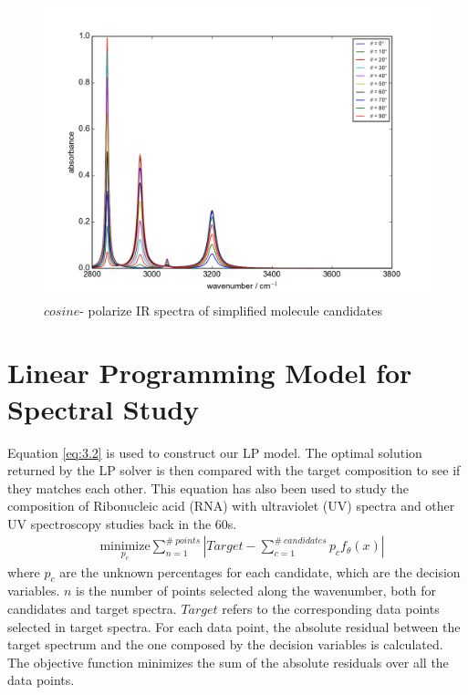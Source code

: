 \begin{figure}[!ht] 
\centering
\includegraphics[scale=0.7]{Figures/Toy_Model_IR_Cosine_Projection.png} 
\caption{$cosine$- polarize IR spectra of simplified molecule candidates} \label{fig:3.1}
\end{figure}


\section{Linear Programming Model for Spectral Study}

Equation \ref{eq:3.2} is used to construct our LP model. The optimal solution returned by the LP solver is then compared with the target composition to see if they matches each other. This equation has also been used to study the composition of Ribonucleic acid (RNA) with ultraviolet (UV) spectra \cite{NYAS:NYAS900} and other UV spectroscopy studies  \cite{LPATUAS} back in the 60s. \\

\begin{eqnarray} \label{eq:3.2}
& \underset{p_{c}} {\text{minimize}} \displaystyle\sum^{\#~points}_{n=1} \left| Target- \displaystyle\sum^{\#~candidates}_{c=1}p_{c}f_{\theta}(x) \right| 
\end{eqnarray}
where $p_{c}$ are the unknown percentages for each candidate, which are the decision variables. $n$ is the number of points selected along the wavenumber, both for candidates and target spectra. $Target$ refers to the corresponding data points selected in target spectra. For each data point, the absolute residual between the target spectrum and the one composed by the decision variables is calculated. The objective function minimizes the sum of the absolute residuals over all the data points. \\

